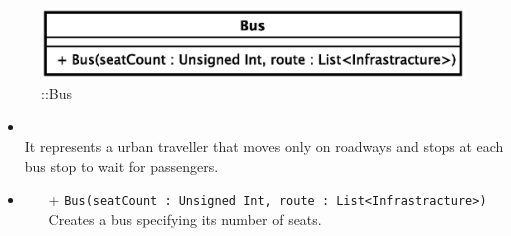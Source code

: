 \begin{figure}[h]
\centering
\includegraphics[scale=0.6,keepaspectratio]{images/solution/app/backend/bus.eps}
\caption{\pActive::Bus}
\label{fig:sd-app-bus}
\end{figure}
\FloatBarrier
\begin{itemize}
  \item \textbf{\descr} \\
It represents a urban traveller that moves only on roadways and stops at each bus stop to
wait for passengers.
\item \textbf{\ops}
  \begin{itemize}
  \item[+] \texttt{Bus(seatCount : Unsigned Int, route : List<Infrastracture>)} \\
Creates a bus specifying its number of seats.
  \end{itemize}
\end{itemize} 
